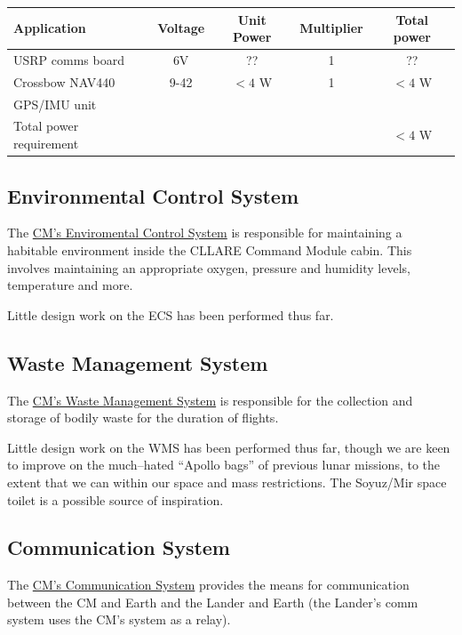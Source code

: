 \documentclass{report}
\begin{document}
\begin{tabular}{ | l | c | c | c | c | }
\hline
Application & Voltage & Unit Power & Multiplier & Total power \\
\hline
\hline
USRP comms board & 6V & ?? & 1 & ?? \\
\hline
Crossbow NAV440 & 9-42 & $<4$ W & 1 & $<4$ W \\
GPS/IMU unit & & & & \\
\hline
\hline
Total power requirement & & & & $<4$ W \\
\hline
\end{tabular}

\subsection{Environmental Control System}

The \href{http://cstart.org/wiki/CLLARE_Environmental_Control_System}{CM's Enviromental Control System} is responsible for maintaining a habitable environment inside the CLLARE Command Module cabin. This involves maintaining an appropriate oxygen, pressure and humidity levels, temperature and more.

Little design work on the ECS has been performed thus far.

\subsection{Waste Management System}

The \href{http://cstart.org/wiki/CLLARE_Waste_Management_System}{CM's Waste Management System} is responsible for the collection and storage of bodily waste for the duration of flights.

Little design work on the WMS has been performed thus far, though we are keen to improve on the much--hated ``Apollo bags'' of previous lunar missions, to the extent that we can within our space and mass restrictions.  The Soyuz/Mir space toilet is a possible source of inspiration.

\subsection{Communication System}

The \href{http://cstart.org/wiki/CLLARE_CM_Communication_System}{CM's Communication System} provides the means for communication between the CM and Earth and the Lander and Earth (the Lander's comm system uses the CM's system as a relay).
\end{document}
